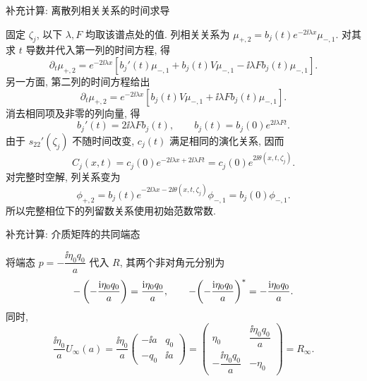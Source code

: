 \par\medskip\noindent 补充计算: 离散列相关关系的时间求导\par
固定 $\zeta_j$, 以下 $\lambda,F$ 均取该谱点处的值.
列相关关系为 $\mu_{+,2}=b_j(t)e^{-2\ii\lambda x}\mu_{-,1}$.
对其求 $t$ 导数并代入第一列的时间方程, 得
\begin{equation*}
\partial_t\mu_{+,2}
=e^{-2\ii\lambda x}\left[
b_j'(t)\mu_{-,1}+b_j(t)V\mu_{-,1}
-\ii\lambda F b_j(t)\mu_{-,1}\right].
\end{equation*}
另一方面, 第二列的时间方程给出
\begin{equation*}
\partial_t\mu_{+,2}
=e^{-2\ii\lambda x}\left[
b_j(t)V\mu_{-,1}+\ii\lambda F b_j(t)\mu_{-,1}\right].
\end{equation*}
消去相同项及非零的列向量, 得
\begin{equation*}
b_j'(t)=2\ii\lambda F b_j(t),\qquad
b_j(t)=b_j(0)e^{2\ii\lambda Ft}.
\end{equation*}
由于 $s_{22}'(\zeta_j)$ 不随时间改变, $c_j(t)$ 满足相同的演化关系, 因而
\begin{equation*}
C_j(x,t)=c_j(0)e^{-2\ii\lambda x+2\ii\lambda Ft}
=c_j(0)e^{2\ii\theta(x,t,\zeta_j)}.
\end{equation*}
对完整时空解, 列关系变为
\begin{equation*}
\phi_{+,2}
=b_j(t)e^{-2\ii\lambda x-2\ii\theta(x,t,\zeta_j)}\phi_{-,1}
=b_j(0)\phi_{-,1}.
\end{equation*}
所以完整相位下的列留数关系使用初始范数常数.

\par\medskip\noindent 补充计算: 介质矩阵的共同端态\par
将端态 $p=-\dfrac{\ii\eta_0q_0}{a}$ 代入 $R$, 其两个非对角元分别为
\begin{equation*}
-\left(-\dfrac{\mathrm{i}\eta_0q_0}{a}\right)=\dfrac{\mathrm{i}\eta_0q_0}{a},\qquad
-{\left(-\dfrac{\mathrm{i}\eta_0q_0}{a}\right)}^{*}=-\dfrac{\mathrm{i}\eta_0q_0}{a}.
\end{equation*}
同时,
\begin{equation*}
\dfrac{\ii\eta_0}{a}U_\infty(a)
=\dfrac{\ii\eta_0}{a}
\begin{pmatrix}-\ii a&q_0\\-q_0&\ii a\end{pmatrix}
=\begin{pmatrix}
\eta_0&\dfrac{\ii\eta_0q_0}{a}\\
-\dfrac{\ii\eta_0q_0}{a}&-\eta_0
\end{pmatrix}=R_\infty.
\end{equation*}

